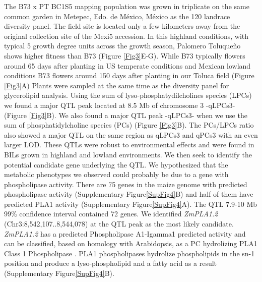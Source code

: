 \documentclass[9pt,twocolumn,twoside]{BioRxiv}
\begin{document}
The B73 x PT BC1S5 mapping population was grown in triplicate on the same common garden in Metepec, Edo. de México, México as the 120 landrace diversity panel. 
The field site is located only a few kilometers away from the original collection site of the Mexi5 accession. 
In this highland conditions, with typical 5 growth degree units across the growth season, Palomero Toluqueño shows higher fitness than B73 (Figure \ref{Fig3}E-G).
While B73 typically flowers around 65 days after planting in US temperate conditions and Mexican lowland conditions B73 flowers around 150 days after planting in our Toluca field (Figure \ref{Fig3}A)
Plants were sampled at the same time as the diversity panel for glycerolipid analysis.  
Using the sum of lyso-phosphatydilcholines species (LPCs) we found a major QTL peak located at 8.5 Mb of chromosome 3 -qLPCs3- (Figure \ref{Fig3}B). 
We also found a major QTL peak -qLPCs3- when we use the sum of phosphatidylcholine species (PCs) (Figure \ref{Fig3}B). 
The PCs/LPCs ratio also showed a major QTL on the same region as qLPCs3 and qPCs3 with an even larger LOD. 
These QTLs were robust to environmental effects and were found in BILs grown in highland and lowland environments. 
We then seek to identify the potential candidate gene underlying the QTL. 
We hypothesized that the metabolic phenotypes we observed could probably be due to a gene with phospholipase activity. 
There are 75 genes in the maize genome with predicted phospholipase activity (Supplementary Figure\ref{SupFig4}B) and half of them have predicted PLA1 activity (Supplementary Figure\ref{SupFig4}A).  
The QTL 7.9-10 Mb 99\% confidence interval contained 72 genes. 
We identified \textit{ZmPLA1.2} (Chr3:8,542,107..8,544,078) at the QTL peak as the most likely candidate. 
\textit{ZmPLA1.2} has a predicted Phospholipase A1-Igamma1 predicted activity and can be classified, based on homology with Arabidopsis, as a PC hydrolizing PLA1 Class 1 Phospholipase \cite{Ryu2004-iv}. 
PLA1 phospholipases hydrolize phospholipids in the sn-1 position and produce a lyso-phospholipid and a fatty acid as a result (Supplementary Figure\ref{SupFig4}B). 
\end{document}
